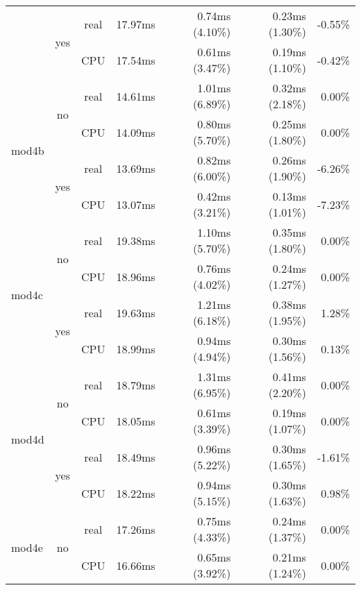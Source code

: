 \documentclass[en]{pracamgr}
\begin{document}
\begin{appendices}
\begin{small}
\begin{longtable}{|l|c|c|r|r|r|r|}
                          \cline{2-7}
                          & \multirow{2}{*}{yes} & real & 17.97ms & 0.74ms (4.10\%) & 0.23ms (1.30\%) & -0.55\% \\*
                          &                      & CPU  & 17.54ms & 0.61ms (3.47\%) & 0.19ms (1.10\%) & -0.42\% \\
\hline
\multirow{4}{*}{mod4b}    & \multirow{2}{*}{no}  & real & 14.61ms & 1.01ms (6.89\%) & 0.32ms (2.18\%) & 0.00\% \\*
                          &                      & CPU  & 14.09ms & 0.80ms (5.70\%) & 0.25ms (1.80\%) & 0.00\% \\*
                          \cline{2-7}
                          & \multirow{2}{*}{yes} & real & 13.69ms & 0.82ms (6.00\%) & 0.26ms (1.90\%) & -6.26\% \\*
                          &                      & CPU  & 13.07ms & 0.42ms (3.21\%) & 0.13ms (1.01\%) & -7.23\% \\
\hline
\multirow{4}{*}{mod4c}    & \multirow{2}{*}{no}  & real & 19.38ms & 1.10ms (5.70\%) & 0.35ms (1.80\%) & 0.00\% \\*
                          &                      & CPU  & 18.96ms & 0.76ms (4.02\%) & 0.24ms (1.27\%) & 0.00\% \\*
                          \cline{2-7}
                          & \multirow{2}{*}{yes} & real & 19.63ms & 1.21ms (6.18\%) & 0.38ms (1.95\%) & 1.28\% \\*
                          &                      & CPU  & 18.99ms & 0.94ms (4.94\%) & 0.30ms (1.56\%) & 0.13\% \\
\hline
\multirow{4}{*}{mod4d}    & \multirow{2}{*}{no}  & real & 18.79ms & 1.31ms (6.95\%) & 0.41ms (2.20\%) & 0.00\% \\*
                          &                      & CPU  & 18.05ms & 0.61ms (3.39\%) & 0.19ms (1.07\%) & 0.00\% \\*
                          \cline{2-7}
                          & \multirow{2}{*}{yes} & real & 18.49ms & 0.96ms (5.22\%) & 0.30ms (1.65\%) & -1.61\% \\*
                          &                      & CPU  & 18.22ms & 0.94ms (5.15\%) & 0.30ms (1.63\%) & 0.98\% \\
\hline
\multirow{4}{*}{mod4e}    & \multirow{2}{*}{no}  & real & 17.26ms & 0.75ms (4.33\%) & 0.24ms (1.37\%) & 0.00\% \\*
                          &                      & CPU  & 16.66ms & 0.65ms (3.92\%) & 0.21ms (1.24\%) & 0.00\% \\*

\end{longtable}
\end{small}
\end{appendices}
\end{document}

